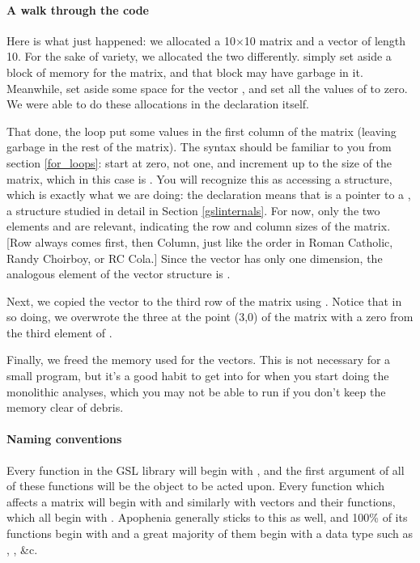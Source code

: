 \paragraph{A walk through the code}
Here is what just happened: we allocated a 10$\times$10 matrix and a vector of
length 10.  For the sake of variety, we  allocated the two differently.
 simply set aside a block of memory for the matrix,
and that block may have garbage in it. Meanwhile,  set
aside some space for the vector , and set all the values of  to
zero.  We were able to do these allocations in the declaration itself.

That done, the  loop put some values in the first column of the matrix (leaving garbage in the rest of the matrix). 
The syntax should be familiar to you from section \ref{for_loops}: start at
zero, not one, and increment up to the size of the matrix, which in this case is
. You will recognize this as accessing a structure, which is exactly
what we are doing: the declaration  means that
 is a pointer to a , a structure
studied in detail in Section \ref{gslinternals}. For now, only
the two elements  and  are relevant,
indicating the row and column sizes of the matrix. [Row always comes first,
then Column, just like the order in Roman Catholic, Randy Choirboy,
or RC Cola.] Since the vector has only one dimension, the analogous
element of the vector structure is .

Next, we copied the vector to the third row of the matrix using . Notice that in so doing, we
overwrote the three at the point (3,0) of the matrix with a zero from
the third element of .

Finally, we freed the memory used for the vectors. This is not 
necessary for a small program,
but it's a good habit to get into for
when you start doing the monolithic analyses, which you may not be
able to run if you don't keep the memory clear of debris.

\paragraph{Naming conventions}  
Every function in the GSL library will begin with , and
the first argument of all of these functions will be the object to be acted upon.
Every function which affects a matrix will begin with 
and similarly with vectors and their functions, which all begin with . 
Apophenia generally sticks to this as well, and 100\% of its functions
begin with  and a great majority of them begin with a data
type such as , , \&c.

